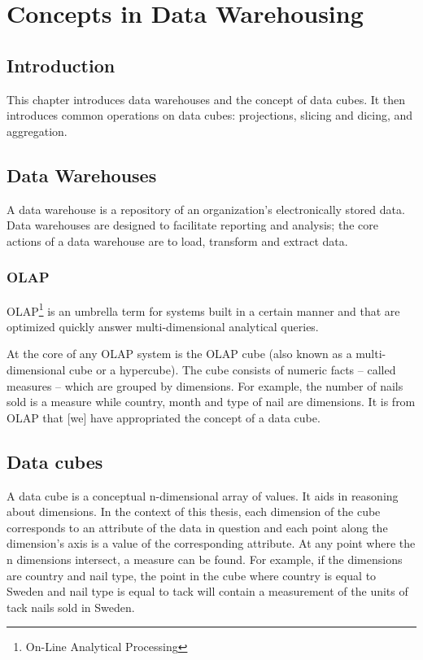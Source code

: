 \chapter{Concepts in Data Warehousing}

\section*{Introduction}

This chapter introduces data warehouses and the concept of data cubes. It then
introduces common operations on data cubes: projections, slicing and dicing,
and aggregation.


\section{Data Warehouses}

A data warehouse is a repository of an organization's electronically stored
data. Data warehouses are designed to facilitate reporting and analysis; the
core actions of a data warehouse are to load, transform and extract data.

\subsection*{OLAP}

OLAP\footnote{On-Line Analytical Processing} is an umbrella term for systems
built in a certain manner and that are optimized quickly answer
multi-dimensional analytical queries.

At the core of any OLAP system is the OLAP cube (also known as a
multi-dimensional cube or a hypercube). The cube consists of numeric facts
-- called measures -- which are grouped by dimensions. For example, the number
of nails sold is a measure while country, month and type of nail are
dimensions. It is from OLAP that [we] have appropriated the concept of a data
cube.


\section{Data cubes}

A data cube is a conceptual n-dimensional array of values. It aids in
reasoning about dimensions. In the context of this thesis, each dimension of
the cube corresponds to an attribute of the data in question and each point
along the dimension's axis is a value of the corresponding attribute. At any
point where the n dimensions intersect, a measure can be found. For example,
if the dimensions are country and nail type, the point in the cube where
country is equal to Sweden and nail type is equal to tack will contain a
measurement of the units of tack nails sold in Sweden.

